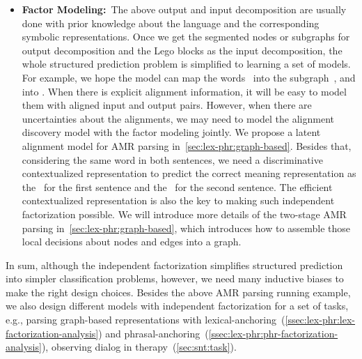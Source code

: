{\begin{itemize}
\item \textbf{Factor Modeling:}~The above output and input
  decomposition are usually done with prior knowledge about the
  language and the corresponding symbolic representations. Once we get
  the segmented nodes or subgraphs for output decomposition and the
  Lego blocks as the input decomposition, the whole structured
  prediction problem is simplified to learning a set of models. For
  example, we hope the model can map the words~ into
  the subgraph~, and 
  into . When there is explicit alignment
  information, it will be easy to model them with aligned input and
  output pairs. However, when there are uncertainties about the
  alignments, we may need to model the alignment discovery model with
  the factor modeling jointly. We propose a latent alignment model for
  AMR parsing in~\autoref{sec:lex-phr:graph-based}. Besides that,
  considering the same word  in both sentences, we need
  a discriminative contextualized representation to predict the
  correct meaning representation as the~ for the
  first sentence and the~ for the second
  sentence. The efficient contextualized representation is also the
  key to making such independent factorization possible. We will
  introduce more details of the two-stage AMR parsing
  in~\autoref{sec:lex-phr:graph-based}, which introduces how to
  assemble those local decisions about nodes and edges into a graph.
\end{itemize}

In sum, although the independent factorization simplifies structured
prediction into simpler classification problems, however, we need many
inductive biases to make the right design choices. Besides the above
AMR parsing running example, we also design different models with
independent factorization for a set of tasks, e.g., parsing
graph-based representations with
lexical-anchoring~(\autoref{ssec:lex-phr:lex-factorization-analysis})
and
phrasal-anchoring~(\autoref{ssec:lex-phr:phr-factorization-analysis}),
observing dialog in therapy~(\autoref{sec:snt:task}).

}
